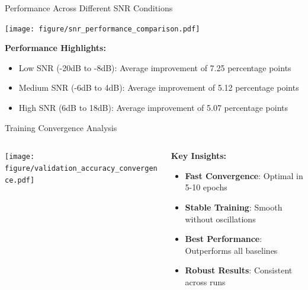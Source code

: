 \documentclass[aspectratio=169]{beamer}
\begin{document}
\begin{frame}{Performance Across Different SNR Conditions}
\begin{center}
\texttt{[image: figure/snr\_performance\_comparison.pdf]}
\end{center}

\textbf{Performance Highlights:}
\begin{itemize}
\item Low SNR (-20dB to -8dB): Average improvement of 7.25 percentage points
\item Medium SNR (-6dB to 4dB): Average improvement of 5.12 percentage points
\item High SNR (6dB to 18dB): Average improvement of 5.07 percentage points
\end{itemize}
\end{frame}

\begin{frame}{Training Convergence Analysis}
\begin{columns}
\begin{column}{0.55\textwidth}
\texttt{[image: figure/validation\_accuracy\_convergence.pdf]}
\end{column}
\begin{column}{0.45\textwidth}
\textbf{Key Insights:}
\begin{itemize}
\item \textcolor{zjutgreen}{\textbf{Fast Convergence}}: Optimal in 5-10 epochs
\item \textcolor{zjutgreen}{\textbf{Stable Training}}: Smooth without oscillations
\item \textcolor{zjutgreen}{\textbf{Best Performance}}: Outperforms all baselines
\item \textcolor{zjutgreen}{\textbf{Robust Results}}: Consistent across runs
\end{itemize}

\vspace{0.3cm}
\begin{center}
\end{center}
\end{column}
\end{columns}
\end{frame}
\end{document}
